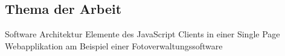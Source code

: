 



\usepackage[utf8]{inputenc} %




%


\newcommand{\vorname}{Anastasia}
\newcommand{\nachname}{Stieb}
\newcommand{\matrikelnummer}{Matrikel-Nr. 2023959}

\newcommand{\titel}{Software Architektur Elemente des JavaScript Clients in einer Single Page Webapplikation \\[0.2ex]
				\Large am Beispiel einer Fotoverwaltungssoftware}

\newcommand{\erstpruef}{Prof. Dr. Andreas Plaß}
\newcommand{\zweitpruef}{Prof. Dr. Torsten Edeler}

\date{\sffamily Hamburg, 16. 7. 2021}  %



\maketitle           %
\newpage


\thispagestyle{empty}

\subsection*{Thema der Arbeit}
Software Architektur Elemente des JavaScript Clients in einer Single Page Webapplikation am Beispiel einer Fotoverwaltungssoftware


